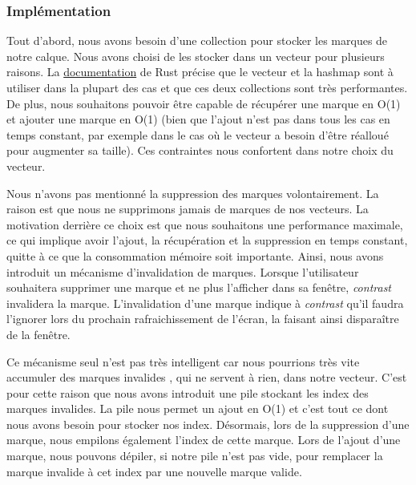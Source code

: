 \documentclass[12pt]{article}
\begin{document}
\subsubsection{Implémentation}

Tout d'abord, nous avons besoin d'une collection pour stocker les marques de notre calque.
Nous avons choisi de les stocker dans un vecteur pour plusieurs raisons.
La \href{https://doc.rust-lang.org/std/collections/index.html}{documentation} de Rust précise que le
vecteur et la hashmap sont à utiliser dans la plupart des cas et que ces deux collections sont très
performantes.
De plus, nous souhaitons pouvoir être capable de récupérer une marque en O(1) et ajouter une marque en
O(1) (bien que l'ajout n'est pas dans tous les cas en temps constant, par exemple dans le cas où le
vecteur a besoin d'être réalloué pour augmenter sa taille). Ces contraintes nous confortent dans notre
choix du vecteur.

Nous n'avons pas mentionné la suppression des marques volontairement. La raison est que nous ne supprimons
jamais de marques de nos vecteurs. La motivation derrière ce choix est que nous souhaitons une performance
maximale, ce qui implique avoir l'ajout, la récupération et la suppression en temps constant, quitte à
ce que la consommation mémoire soit importante.
Ainsi, nous avons introduit un mécanisme d'invalidation de marques. Lorsque l'utilisateur souhaitera
supprimer une marque et ne plus l'afficher dans sa fenêtre, \textit{contrast} invalidera la marque.
L'invalidation d'une marque indique à \textit{contrast} qu'il faudra l'ignorer lors du prochain
rafraichissement de l'écran, la faisant ainsi disparaître de la fenêtre.

Ce mécanisme seul n'est pas très intelligent car nous pourrions très vite accumuler des marques invalides
, qui ne servent à rien, dans notre vecteur.
C'est pour cette raison que nous avons introduit une pile stockant les index des marques invalides.
La pile nous permet un ajout en O(1) et c'est tout ce dont nous avons besoin pour stocker nos index.
Désormais, lors de la suppression d'une marque, nous empilons également l'index de cette marque.
Lors de l'ajout d'une marque, nous pouvons dépiler, si notre pile n'est pas vide, pour remplacer la
marque invalide à cet index par une nouvelle marque valide.
\end{document}
